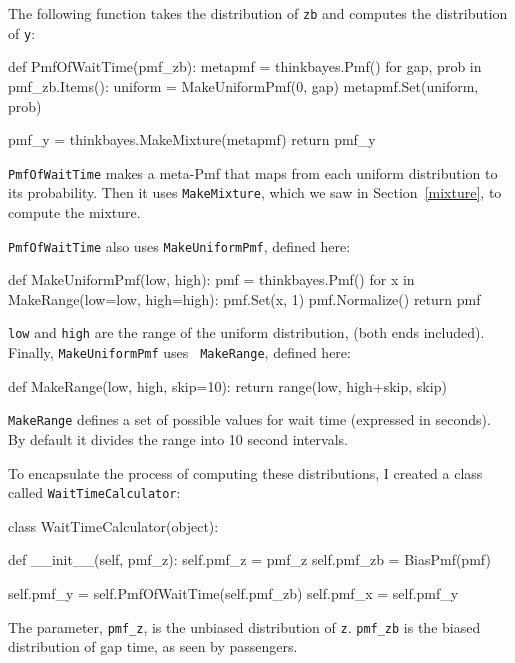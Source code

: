 \documentclass[12pt]{book}
\theoremstyle{exercise}
\begin{document}
The following function takes the distribution of {\tt zb} and
computes the distribution of {\tt y}:

\begin{code}
def PmfOfWaitTime(pmf_zb):
    metapmf = thinkbayes.Pmf()
    for gap, prob in pmf_zb.Items():
        uniform = MakeUniformPmf(0, gap)
        metapmf.Set(uniform, prob)

    pmf_y = thinkbayes.MakeMixture(metapmf)
    return pmf_y
\end{code}

{\tt PmfOfWaitTime} makes a meta-Pmf that maps from each uniform
distribution to its probability.  Then it uses {\tt MakeMixture},
which we saw in Section~\ref{mixture}, to compute the mixture.

{\tt PmfOfWaitTime} also uses {\tt MakeUniformPmf}, defined here:

\begin{code}
def MakeUniformPmf(low, high):
    pmf = thinkbayes.Pmf()
    for x in MakeRange(low=low, high=high):
        pmf.Set(x, 1)
    pmf.Normalize()
    return pmf
\end{code}

{\tt low} and {\tt high} are the range of the uniform distribution,
(both ends included).  Finally, {\tt MakeUniformPmf} uses {\tt
  MakeRange}, defined here:

\begin{code}
def MakeRange(low, high, skip=10):
    return range(low, high+skip, skip)
\end{code}

{\tt MakeRange} defines a set of possible values for wait time
(expressed in seconds).  By default it divides the range into 
10 second intervals.

To encapsulate the process of computing these distributions, I
created a class called {\tt WaitTimeCalculator}:

\begin{code}
class WaitTimeCalculator(object):

    def __init__(self, pmf_z):
        self.pmf_z = pmf_z
        self.pmf_zb = BiasPmf(pmf)

        self.pmf_y = self.PmfOfWaitTime(self.pmf_zb)
        self.pmf_x = self.pmf_y
\end{code}

The parameter, \verb"pmf_z", is the unbiased distribution of {\tt z}.
\verb"pmf_zb" is the biased distribution of gap time, as seen by
passengers.
\end{document}
